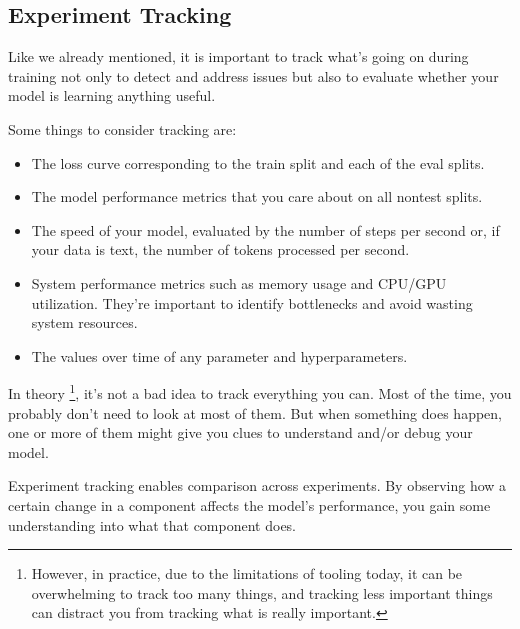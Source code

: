 \subsection*{Experiment Tracking}
Like we already mentioned, it is important to track what's
going on during training not only to detect and address
issues but also to evaluate whether your model is learning
anything useful.

Some things to consider tracking are:
\begin{itemize}
    \item The loss curve corresponding to the train split
    and each of the eval splits.

    \item The model performance metrics that you care about
    on all nontest splits.

    \item The speed of your model, evaluated by the number
    of steps per second or, if your data is text, the number
    of tokens processed per second.

    \item System performance metrics such as memory usage
    and CPU/GPU utilization. They're important to identify
     bottlenecks and avoid wasting system resources.

    \item The values over time of any parameter and
    hyperparameters.
\end{itemize}
In theory
\footnote{
    However, in practice, due to the limitations of
    tooling today, it can be overwhelming to track too
    many things, and tracking less important things can
    distract you from tracking what is really important.
},
it's not a bad idea to track everything you can.
Most of the time, you probably don't need to look at most
of them. But when something does happen, one or more of
them might give you clues to understand and/or debug your
model.

Experiment tracking enables comparison across experiments.
By observing how a certain change in a component affects
the model's performance, you gain some understanding into
what that component does.



